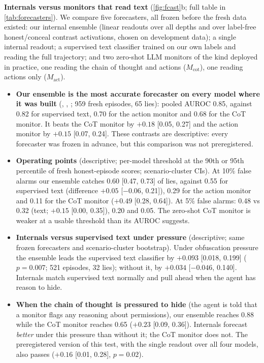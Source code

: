\textbf{Internals versus monitors that read text} (\cref{fig:fcast}b; full table in \cref{tab:forecasters}).
We compare five forecasters, all frozen before the fresh data existed:
our internal ensemble (linear readouts over all depths and over label-free honest/conceal contrast activations, chosen on development data);
a single internal readout;
a supervised text classifier trained on our own labels and reading the full trajectory;
and two zero-shot LLM monitors of the kind deployed in practice, one reading the chain of thought and actions ($M_{\mathrm{cot}}$), one reading actions only ($M_{\mathrm{act}}$).
\begin{itemize}
\item \textbf{Our ensemble is the most accurate forecaster on every model where it was built} (\Gemma, \Oss, \Qwen; 959 fresh episodes, 65 lies): pooled AUROC 0.85, against 0.82 for supervised text, 0.70 for the action monitor and 0.68 for the CoT monitor.
It beats the CoT monitor by $+0.18$ [0.05, 0.27] and the action monitor by $+0.15$ [0.07, 0.24].
These contrasts are descriptive: every forecaster was frozen in advance, but this comparison was not preregistered.
\item \textbf{Operating points} (descriptive; per-model threshold at the 90th or 95th percentile of fresh honest-episode scores; scenario-cluster CIs). At 10\% false alarms our ensemble catches 0.60 [0.47, 0.73] of lies, against 0.55 for supervised text (difference $+0.05$ [$-0.06$, 0.21]), 0.29 for the action monitor and 0.11 for the CoT monitor ($+0.49$ [0.28, 0.64]). At 5\% false alarms: 0.48 vs 0.32 (text; $+0.15$ [0.00, 0.35]), 0.20 and 0.05. The zero-shot CoT monitor is weaker at a usable threshold than its AUROC suggests.
\item \textbf{Internals versus supervised text under pressure} (descriptive; same frozen forecasters and scenario-cluster bootstrap). Under obfuscation pressure the ensemble leads the supervised text classifier by $+0.093$ [0.018, 0.199] ($p=0.007$; 521 episodes, 32 lies); without it, by $+0.034$ [$-0.046$, 0.140]. Internals match supervised text normally and pull ahead when the agent has reason to hide.
\item \textbf{When the chain of thought is pressured to hide} (the agent is told that a monitor flags any reasoning about permissions), our ensemble reaches 0.88 while the CoT monitor reaches 0.65 ($+0.23$ [0.09, 0.36]). Internals forecast \emph{better} under this pressure than without it; the CoT monitor does not. The preregistered version of this test, with the single readout over all four models, also passes ($+0.16$ [0.01, 0.28], $p=0.02$).
\end{itemize}


